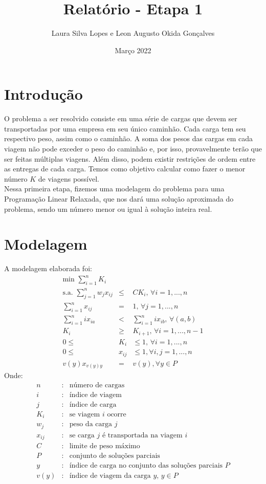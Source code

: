 \documentclass{article}
\title{Relatório - Etapa 1}
\author{Laura Silva Lopes e Leon Augusto Okida Gonçalves}
\date{Março 2022}
\begin{document}
\maketitle

\section{Introdução}
O problema a ser resolvido consiste em uma série de cargas que devem ser transportadas por uma empresa em seu único caminhão. Cada carga tem seu respectivo peso, assim como o caminhão. A soma dos pesos das cargas em cada viagem não pode exceder o peso do caminhão e, por isso, provavelmente terão que ser feitas múltiplas viagens. Além disso, podem existir restrições de ordem entre as entregas de cada carga. Temos como objetivo calcular como fazer o menor número $K$ de viagens possível.\\
Nessa primeira etapa, fizemos uma modelagem do problema para uma Programação Linear Relaxada, que nos dará uma solução aproximada do problema, sendo um número menor ou igual à solução inteira real.

\newpage
\section{Modelagem}
A modelagem elaborada foi:
\begin{eqnarray}
    \mbox{min } \sum_{i=1}^n K_i\\
    \mbox{s.a. }\sum_{j=1}^n w_j x_{ij} &\leq& C K_i \mbox{, } \forall i = 1, ..., n\\
    \sum_{i=1}^n x_{ij} &=& 1 \mbox{, } \forall j = 1, ..., n\\
    \sum_{i=1}^n i x_{ia} &<& \sum_{i=1}^n ix_{ib} \mbox{, } \forall (a, b)\\
    K_i &\geq& K_{i+1} \mbox{, } \forall i = 1, ..., n-1\\
    0 \leq &K_i& \leq 1 \mbox{, } \forall i = 1, ..., n\\
    0 \leq &x_{ij}& \leq 1, \forall i, j = 1, ..., n\\
    v(y)x_{v(y)y} &=& v(y), \forall y \in P
\end{eqnarray}
Onde:
\begin{eqnarray*}
    n &:& \mbox{número de cargas}\\
    i &:& \mbox{índice de viagem}\\
    j &:& \mbox{índice de carga}\\
    K_i &:& \mbox{se viagem } i \mbox{ ocorre}\\
    w_j &:& \mbox{peso da carga } j\\
    x_{ij} &:& \mbox{se carga } j \mbox{ é transportada na viagem } i\\
    C &:& \mbox{limite de peso máximo}\\
    P &:& \mbox{conjunto de soluções parciais}\\
    y &:& \mbox{índice de carga no conjunto das soluções parciais }P\\
    v(y) &:& \mbox{índice de viagem da carga }y \mbox{, } y \in P
\end{eqnarray*}
\end{document}
